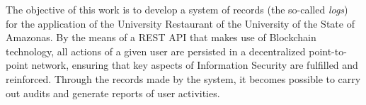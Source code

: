 The objective of this work is to develop a system of records (the so-called \emph{logs}) for the application of the University Restaurant of the University of the State of Amazonas. By the means of a REST API that makes use of Blockchain technology, all actions of a given user are persisted in a decentralized point-to-point network, ensuring that key aspects of Information Security are fulfilled and reinforced. Through the records made by the system, it becomes possible to carry out audits and generate reports of user activities.